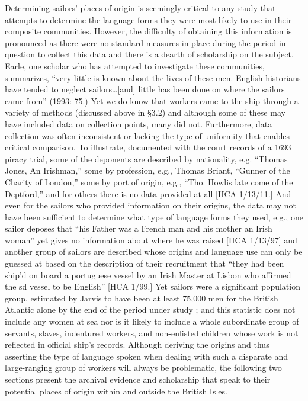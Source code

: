   Determining sailors’ places of origin is seemingly critical to any study that attempts to determine the language forms they were most likely to use in their composite communities. However, the difficulty of obtaining this information is pronounced as there were no standard measures in place during the period in question to collect this data and there is a dearth of scholarship on the subject. Earle, one scholar who has attempted to investigate these communities, summarizes, “very little is known about the lives of these men. English historians have tended to neglect sailors…[and] little has been done on where the sailors came from” (1993: 75.) Yet we do know that workers came to the ship through a variety of methods (discussed above in §3.2) and although some of these may have included data on collection points, many did not. Furthermore, data collection was often inconsistent or lacking the type of uniformity that enables critical comparison. To illustrate, documented with the court records of a 1693 piracy trial, some of the deponents are described by nationality, e.g. “Thomas Jones, An Irishman,” some by profession, e.g., Thomas Briant, “Gunner of the Charity of London,” some by port of origin, e.g., “Tho. Howlis late come of the Deptford,” and for others there is no data provided at all [HCA 1/13/11.] And even for the sailors who provided information on their origins, the data may not have been sufficient to determine what type of language forms they used, e.g., one sailor deposes that “his Father was a French man and his mother an Irish woman” yet gives no information about where he was raised [HCA 1/13/97] and another group of sailors are described whose origins and language use can only be guessed at based on the description of their recruitment that “they had been ship’d on board a portuguese vessel by an Irish Master at Lisbon who affirmed the sd vessel to be English” [HCA 1/99.] Yet sailors were a significant population group, estimated by Jarvis to have been at least 75,000 men for the British Atlantic alone by the end of the period under study \citep[252]{Jarvis2010}; and this statistic does not include any women at sea nor is it likely to include a whole subordinate group of servants, slaves, indentured workers, and non-enlisted children whose work is not reflected in official ship’s records. Although deriving the origins and thus asserting the type of language spoken when dealing with such a disparate and large-ranging group of workers will always be problematic, the following two sections present the archival evidence and scholarship that speak to their potential places of origin within and outside the British Isles.


